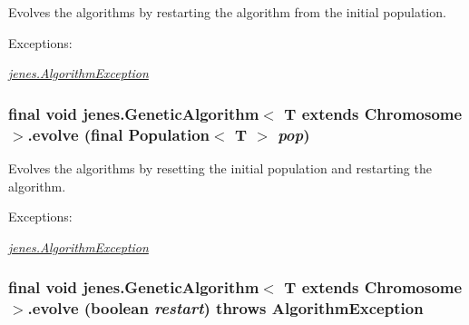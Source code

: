 Evolves the algorithms by restarting the algorithm from the initial population.

\begin{Desc}
\item[Exceptions:]
\begin{description}
\item[{\em \hyperlink{classjenes_1_1_algorithm_exception}{jenes.AlgorithmException}}]\end{description}
\end{Desc}
\hypertarget{classjenes_1_1_genetic_algorithm_3_01_t_01extends_01_chromosome_01_4_fea32755ac446883e283d2eec6bc69fa}{
\subsubsection[evolve]{\setlength{\rightskip}{0pt plus 5cm}final void jenes.GeneticAlgorithm$<$ T extends Chromosome $>$.evolve (final Population$<$ T $>$ {\em pop})}}
\label{classjenes_1_1_genetic_algorithm_3_01_t_01extends_01_chromosome_01_4_fea32755ac446883e283d2eec6bc69fa}


Evolves the algorithms by resetting the initial population and restarting the algorithm.

\begin{Desc}
\item[Exceptions:]
\begin{description}
\item[{\em \hyperlink{classjenes_1_1_algorithm_exception}{jenes.AlgorithmException}}]\end{description}
\end{Desc}
\hypertarget{classjenes_1_1_genetic_algorithm_3_01_t_01extends_01_chromosome_01_4_f8bb6842d525c274bfb8a3efc9ca5b23}{
\subsubsection[evolve]{\setlength{\rightskip}{0pt plus 5cm}final void jenes.GeneticAlgorithm$<$ T extends Chromosome $>$.evolve (boolean {\em restart})  throws {\bf AlgorithmException} }}
\label{classjenes_1_1_genetic_algorithm_3_01_t_01extends_01_chromosome_01_4_f8bb6842d525c274bfb8a3efc9ca5b23}


